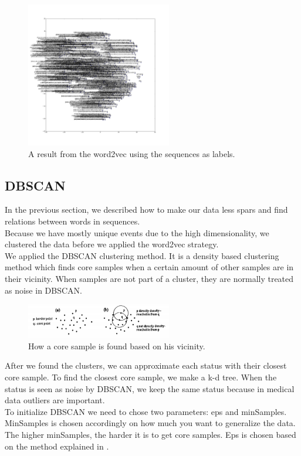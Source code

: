 \documentclass[journal]{IEEETemplate/IEEEtran}
\begin{document}
\begin{figure}[H]
\centering
\includegraphics[width=2.5in]{../Figures/visualisation.png}
\caption{A result from the word2vec using the sequences as labels.}
\label{fig:word2vec}
\end{figure}

\subsection{DBSCAN}
In the previous section, we described how to make our data less spars and find relations between words in sequences. \\
Because we have mostly unique events due to the high dimensionality, we clustered the data before we applied the word2vec strategy. \\
We applied the DBSCAN clustering method. It is a density based clustering method which finds core samples when a certain amount of other samples are in their vicinity. When samples are not part of a cluster, they are normally treated as noise in DBSCAN. 

\begin{figure}[H]
\centering
\includegraphics[width=2.5in]{../Figures/dbscan.pdf}
\caption{How a core sample is found based on his vicinity.}
\label{fig:word2vec}
\end{figure}

After we found the clusters, we can approximate each status with their closest core sample. To find the closest core sample, we make a k-d tree\cite{13b}. When the status is seen as noise by DBSCAN, we keep the same status because in medical data outliers are important. \\
To initialize DBSCAN we need to chose two parameters: eps and minSamples. MinSamples is chosen accordingly on how much you want to generalize the data. The higher minSamples, the harder it is to get core samples. Eps is chosen based on the method explained in \cite{13c}.    
\end{document}
